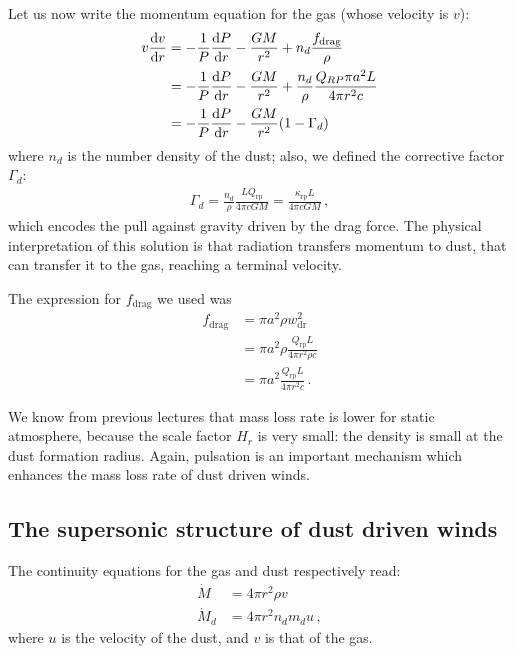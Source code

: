 \documentclass[main.tex]{subfiles}
\begin{document}
Let us now write the momentum equation for the gas (whose velocity is \(v\)): 
%
\begin{subequations}
\begin{align}
v \dv{v}{r}
& =-\frac{1}{P} \dv{P}{r} - \frac{GM}{r^2}+n_d\frac{f_{\text{drag}}}{\rho} \\
&= -\frac{1}{P} \dv{P}{r} - \frac{GM}{r^2}+\frac{n_d}{\rho }\frac{Q_{RP}\pi a^2 L}{4\pi r^2 c}  \\
&=-\frac{1}{P} \dv{P}{r} - \frac{GM}{r^2}(1-\Gamma_d)
\end{align}
\end{subequations}
%
where \(n_d\) is the number density of the dust; also, we defined the corrective factor $\Gamma_d$: 
%
\begin{align}
\Gamma_{d} = \frac{n_d}{\rho } \frac{L Q _{\text{rp}} }{4 \pi c GM} = \frac{\kappa _{\text{rp}} L }{4 \pi c GM}
\,,
\end{align}
%
which encodes the pull against gravity driven by the drag force. 
The physical interpretation of this solution is that radiation transfers momentum to dust, that can transfer it to the gas, reaching a terminal velocity.

The expression for \(f _{\text{drag}}\) we used was 
%
\begin{subequations}
\begin{align}
f _{\text{drag}} &= \pi a^2 \rho w _{\text{dr}}^2  \\
&= \pi a^2 \rho \frac{Q _{\text{rp}} L}{4 \pi r^2 \rho  c }  \\
&= \pi a^2 \frac{Q _{\text{rp}} L}{4 \pi r^2 c}
\,.
\end{align}
\end{subequations}

We know from previous lectures that mass loss rate is lower for static atmosphere, because the scale factor $H_r$ is very small: the density is small at the dust formation radius. 
Again, pulsation is an important mechanism which enhances the mass loss rate of dust driven winds.

\subsection{The supersonic structure of dust driven winds}

The continuity equations for the gas and dust respectively read:
\begin{subequations}
\begin{align}
    \dot M&= 4\pi r^2 \rho v\\
    \dot M_d&=4\pi r^2 n_d m_d u\,,
\end{align}
\end{subequations}
%
where \(u\) is the velocity of the dust, and \(v\) is that of the gas.
\end{document}
